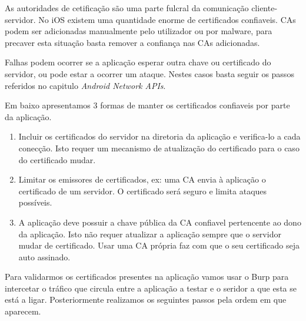 As autoridades de cetificação são uma parte fulcral da comunicação cliente-servidor. No iOS existem uma quantidade enorme de certificados confiaveis. CAs podem ser adicionadas manualmente pelo utilizador ou por malware, para precaver esta situação basta  remover a confiança nas CAs adicionadas.\par
Falhas podem ocorrer se a aplicação esperar outra chave ou certificado do servidor, ou pode estar a ocorrer um ataque.
Nestes casos basta seguir os passos referidos no capitulo \textit{Android Network APIs}\cite{book}.\par
\hfill\par
Em baixo apresentamos 3 formas de manter os certificados confiaveis por parte da aplicação.
\begin{enumerate}
\item Incluir os certificados do servidor na diretoria da aplicação e verifica-lo a cada conecção. Isto requer um mecanismo de atualização do certificado para o caso do certificado mudar.\par
\hfill\par
\item Limitar os emissores de certificados, ex: uma CA envia à aplicação o certificado de um servidor. O certificado será seguro e limita ataques possíveis.\par
\hfill\par
\item A aplicação deve possuir a chave pública da CA confiavel pertencente ao dono da aplicação. Isto não requer atualizar a aplicação sempre que o servidor mudar de certificado. Usar uma CA própria faz com que o seu certificado seja auto assinado.
\end{enumerate}

Para validarmos os certificados presentes na aplicação vamos usar o Burp para intercetar o tráfico que circula entre a aplicação a testar e o seridor a que esta se está a ligar. Posteriormente realizamos os seguintes passos pela ordem em que aparecem.

